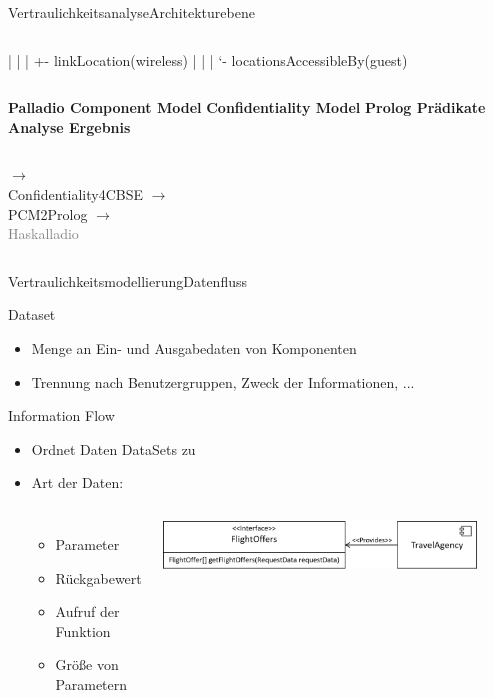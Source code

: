 \documentclass{sdqbeamer}
\begin{document}
\begin{frame}{Vertraulichkeitsanalyse}{Architekturebene}
\begin{columns}[c]
{| | | +- linkLocation(wireless)
| | | ‘- locationsAccessibleBy(guest)}
\end{columns}
\begin{columns}\centering
	\centering
	\textbf{Palladio Component Model}
	\vspace{0.05\textheight}
	\centering
	\textbf{Confidentiality Model}
	\centering
	\textbf{Prolog Prädikate}
	\centering
	\textbf{Analyse Ergebnis}
\end{columns}
\begin{columns}\centering
{}
\centering
$\longrightarrow$ \\
Confidentiality4CBSE\footnotemark[1]
\centering
$\longrightarrow $\\
PCM2Prolog\footnotemark[2]
\centering
$\longrightarrow$ \\
\textcolor{gray}{Haskalladio}
\end{columns}
\end{frame}	


\begin{frame}{Vertraulichkeitsmodellierung}{Datenfluss}

	Dataset
	\begin{itemize}
		\item Menge an Ein- und Ausgabedaten von Komponenten
		\item Trennung nach Benutzergruppen, Zweck der Informationen, ...
	\end{itemize}
	\vspace{0.05\textheight}
	Information Flow
		\begin{itemize}
			\item Ordnet Daten DataSets zu
			\item Art der Daten:
			\begin{columns}
				\begin{itemize}
					\item Parameter
					\item Rückgabewert
					\item Aufruf der Funktion
					\item Größe von Parametern
				\end{itemize}
				\includegraphics[width=0.9\textwidth]{images/interface.png}
				\vspace{0.05\textheight}
			\end{columns}
		\end{itemize}
\end{frame}
	
\end{document}
